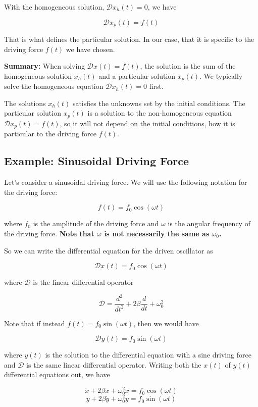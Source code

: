 \documentclass[11pt]{article}
\begin{document}
With the homogeneous solution, \(\mathcal{D} x_h(t) = 0\), we have

\[\mathcal{D} x_p(t) = f(t)\]

That is what defines the particular solution. In our case, that it is
specific to the driving force \(f(t)\) we have chosen.

\textbf{Summary:} When solving \(\mathcal{D} x(t) = f(t)\), the solution
is the sum of the homogeneous solution \(x_h(t)\) and a particular
solution \(x_p(t)\). We typically solve the homogeneous equation
\(\mathcal{D} x_h(t) = 0\) first.

The solutions \(x_h(t)\) satisfies the unknowns set by the initial
conditions. The particular solution \(x_p(t)\) is a solution to the
non-homogeneous equation \(\mathcal{D} x_p(t) = f(t)\), so it will not
depend on the initial conditions, how it is particular to the driving
force \(f(t)\).

    \subsection{Example: Sinusoidal Driving
Force}\label{example-sinusoidal-driving-force}

Let's consider a sinusoidal driving force. We will use the following
notation for the driving force:

\[f(t) = f_0 \cos(\omega t)\]

where \(f_0\) is the amplitude of the driving force and \(\omega\) is
the angular frequency of the driving force. \textbf{Note that \(\omega\)
is not necessarily the same as \(\omega_0\).}

So we can write the differential equation for the driven oscillator as

\[\mathcal{D} x(t) = f_0 \cos(\omega t)\]

where \(\mathcal{D}\) is the linear differential operator

\[\mathcal{D} = \dfrac{d^2}{dt^2} + 2\beta \dfrac{d}{dt} + \omega_0^2\]

Note that if instead \(f(t) = f_0 \sin(\omega t)\), then we would have

\[\mathcal{D} y(t) = f_0 \sin(\omega t)\]

where \(y(t)\) is the solution to the differential equation with a sine
driving force and \(\mathcal{D}\) is the same linear differential
operator. Writing both the \(x(t)\) of \(y(t)\) differential equations
out, we have

\[\ddot{x} + 2\beta \dot{x} + \omega_0^2 x = f_0 \cos(\omega t)\]
\[\ddot{y} + 2\beta \dot{y} + \omega_0^2 y = f_0 \sin(\omega t)\]
\end{document}

